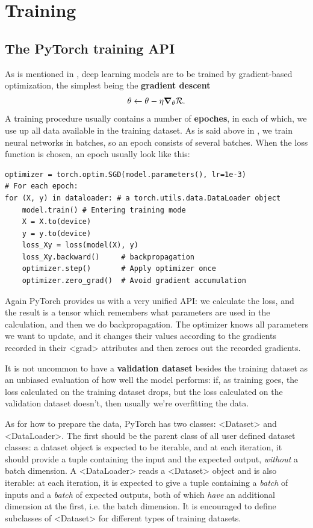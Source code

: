 \documentclass[hyperref, a4paper, 12pt]{report}
\newcommand*{\concept}[1]{{\textbf{#1}}}
\def\texttt#1{<#1>}%
\newcommand{\shortcode}[1]{\texttt{#1}}
\begin{document}
\section{Training}

\subsection{The PyTorch training API}
As is mentioned in , deep learning models are to be trained by gradient-based optimization,
the simplest being the \concept{gradient descent}
\begin{equation}
    \theta \leftarrow \theta - \eta \grad_\theta \mathcal{R}.
    \label{eq:sgd-example}
\end{equation}
A training procedure usually contains a number of \concept{epoches},
in each of which, we use up all data available in the training dataset.
As is said above in , 
we train neural networks in batches, so an epoch consists of several batches.
When the loss function is chosen, 
an epoch usually look like this:

\begin{lstlisting}
optimizer = torch.optim.SGD(model.parameters(), lr=1e-3)
# For each epoch:
for (X, y) in dataloader: # a torch.utils.data.DataLoader object
    model.train() # Entering training mode 
    X = X.to(device)
    y = y.to(device)
    loss_Xy = loss(model(X), y)
    loss_Xy.backward()     # backpropagation
    optimizer.step()       # Apply optimizer once 
    optimizer.zero_grad()  # Avoid gradient accumulation
\end{lstlisting}

Again PyTorch provides us with a very unified API:
we calculate the loss, and the result is a tensor which remembers what parameters are used in the calculation,
and then we do backpropagation.
The optimizer knows all parameters we want to update,
and it changes their values according to the gradients recorded in their \shortcode{grad} attributes
and then zeroes out the recorded gradients.

It is not uncommon to have a \concept{validation dataset} besides the training dataset
as an unbiased evaluation of how well the model performs:
if, as training goes, the loss calculated on the training dataset drops,
but the loss calculated on the validation dataset doesn't,
then usually we're overfitting the data.

As for how to prepare the data,
PyTorch has two classes: \shortcode{Dataset} and \shortcode{DataLoader}.
The first should be the parent class of all user defined dataset classes:
a dataset object is expected to be iterable,
and at each iteration, it should provide a tuple
containing the input and the expected output,
\emph{without} a batch dimension.
A \shortcode{DataLoader} reads a \shortcode{Dataset} object and is also iterable:
at each iteration, it is expected to give a tuple 
containing a \emph{batch} of inputs and a \emph{batch} of expected outputs,
both of which \emph{have} an additional dimension at the first, i.e. the batch dimension.
It is encouraged to define subclasses of \shortcode{Dataset}
for different types of training datasets.
\end{document}
